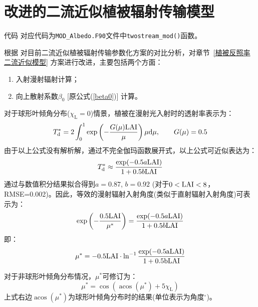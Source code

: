 \section{改进的二流近似植被辐射传输模型}\label{sec:改进的二流近似植被辐射传输模型}
\begin{mymdframed}{代码}
  对应代码为\texttt{MOD\_Albedo.F90}文件中\texttt{twostream\_mod()}函数。
\end{mymdframed}

根据 \citet{yuan2017reexamination} 对目前二流近似植被辐射传输参数化方案的对比分析，对章节~\ref{植被反照率二流近似模型} 方案进行改进，主要包括两个方面：
\begin{enumerate}
  \item 入射漫射辐射计算；
  \item 向上散射系数$\beta_0$ [原公式(\ref{beta0})] 计算。
\end{enumerate}

对于球形叶倾角分布($\chi_{\mathrm {L}}=0$)情景，植被在漫射光入射时的透射率表示为：
\begin{equation}
  T_{\mathrm{d}}^{*}=2 \int_{0}^{1} \exp \left(-\frac{G(\mu) \rm LAI}{\mu}\right) \mu {\mathrm d} \mu, \qquad G(\mu)=0.5
\end{equation}
由于以上公式没有解析解，通过不完全伽玛函数展开式，以上公式可近似表达为：
\begin{equation}
  T_{\mathrm{d}}^{*} \approx \frac{\exp (-0.5 a \rm LAI)}{1+0.5 b \rm LAI}
\end{equation}
通过与数值积分结果拟合得到$a=0.87$, $b=0.92$ (对于$0<\rm LAI<8$，RMSE=0.002)。因此，等效的漫射辐射入射角度(类似于直射辐射入射角度)可表示为：
\begin{equation}
  \exp \left(-\frac{0.5 \rm LAI}{\mu^{*}}\right)=\frac{\exp (-0.5 a \rm LAI)}{1+0.5 b \rm LAI}
\end{equation}
即：
\begin{equation}
  \mu^{*}=-0.5 \rm LAI \cdot \ln ^{-1} \frac{\exp (-0.5 a \rm LAI)}{1+0.5 b \rm LAI}
\end{equation}

对于非球形叶倾角分布情况，$\mu^\ast$可修订为：
\begin{equation}
  \mu^{*}=\cos \left(\operatorname{acos}\left(\mu^{*}\right)+5 \chi_{\mathrm{L}}\right)
\end{equation}
上式右边$\operatorname{acos}\left(\mu^{*}\right)$为球形叶倾角分布时的结果(单位表示为角度$^{\circ}$)。


